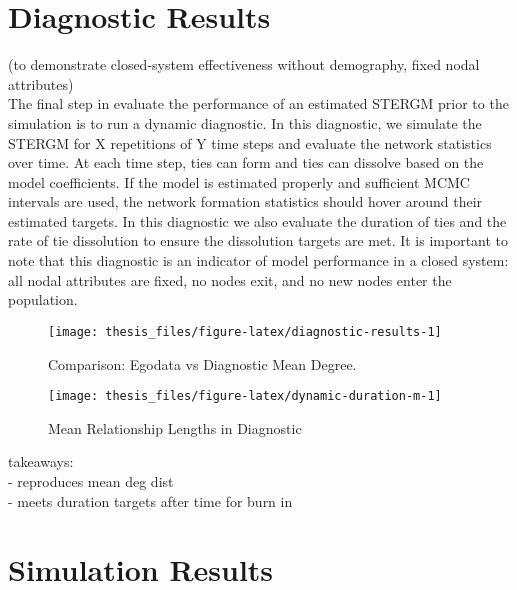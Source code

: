 \documentclass [11pt, proquest] {uwthesis}[2015/03/03]
\begin{document}
\section{Diagnostic Results}\label{diagnostic-results}

(to demonstrate closed-system effectiveness without demography, fixed
nodal attributes)\\
The final step in evaluate the performance of an estimated STERGM prior
to the simulation is to run a dynamic diagnostic. In this diagnostic, we
simulate the STERGM for X repetitions of Y time steps and evaluate the
network statistics over time. At each time step, ties can form and ties
can dissolve based on the model coefficients. If the model is estimated
properly and sufficient MCMC intervals are used, the network formation
statistics should hover around their estimated targets. In this
diagnostic we also evaluate the duration of ties and the rate of tie
dissolution to ensure the dissolution targets are met. It is important
to note that this diagnostic is an indicator of model performance in a
closed system: all nodal attributes are fixed, no nodes exit, and no new
nodes enter the population.
\begin{figure}

{\centering \texttt{[image: thesis\_files/figure-latex/diagnostic-results-1]} 

}

\caption{Comparison: Egodata vs Diagnostic Mean Degree.}\label{fig:diagnostic-results}
\end{figure}
\begin{figure}

{\centering \texttt{[image: thesis\_files/figure-latex/dynamic-duration-m-1]} 

}

\caption{Mean Relationship Lengths in Diagnostic}\label{fig:dynamic-duration-m}
\end{figure}
takeaways:\\
- reproduces mean deg dist\\
- meets duration targets after time for burn in

\section{Simulation Results}\label{simulation-results}
\end{document}
